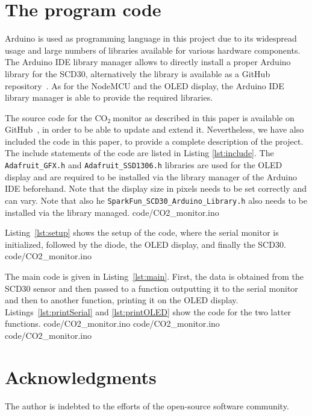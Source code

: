\documentclass[12pt,a4paper]{article}
\newcommand{\coo}{\ensuremath{\mathrm{CO_2}~}}
\begin{document}
\section{The program code}\label{s:code}
Arduino is used as programming language in this project due to its widespread usage and large numbers of libraries available for various hardware components. The Arduino IDE library manager allows to directly install a proper Arduino library for the SCD30, alternatively the library is available as a GitHub repository~\cite{SPARKFUN2020}.
As for the NodeMCU and the OLED display, the Arduino IDE library manager is able to provide the required libraries.

The source code for the \coo monitor as described in this paper is available on GitHub~\cite{KOEHN2020}, in order to be able to update and extend it. Nevertheless, we have also included the code in this paper, to provide a complete description of the project. The include statements of the code are listed in Listing \ref{lst:include}. The \texttt{Adafruit\_GFX.h} and \texttt{Adafruit\_SSD1306.h} libraries are used for the OLED display and are required to be installed via the library manager of the Arduino IDE beforehand. Note that the display size in pixels needs to be set correctly and can vary. Note that also he \texttt{SparkFun\_SCD30\_Arduino\_Library.h} also needs to be installed via the library managed.
%
{code/CO2_monitor.ino} 

Listing~\ref{lst:setup} shows the setup of the code, where the serial monitor is initialized, followed by the diode, the OLED display, and finally the SCD30. 
%
{code/CO2_monitor.ino}

The main code is given in Listing~\ref{lst:main}. First, the data is obtained from the SCD30 sensor and then passed to a function outputting it to the serial monitor and then to another function, printing it on the OLED display. Listings~\ref{lst:printSerial} and \ref{lst:printOLED} show the code for the two latter functions.
%
{code/CO2_monitor.ino} 
%
{code/CO2_monitor.ino} 
%
{code/CO2_monitor.ino} 


\section*{Acknowledgments}
The author is indebted to the efforts of the open-source software community.



\end{document}
